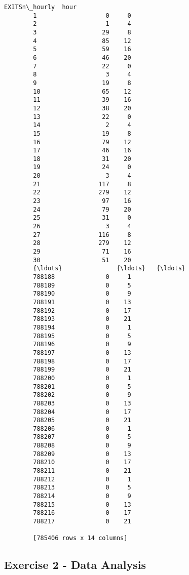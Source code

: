 \documentclass[11pt]{article}
\begin{document}
\begin{Verbatim}[commandchars=\\\{\}]
                EXITSn\_hourly  hour  
        1                   0     0  
        2                   1     4  
        3                  29     8  
        4                  85    12  
        5                  59    16  
        6                  46    20  
        7                  22     0  
        8                   3     4  
        9                  19     8  
        10                 65    12  
        11                 39    16  
        12                 38    20  
        13                 22     0  
        14                  2     4  
        15                 19     8  
        16                 79    12  
        17                 46    16  
        18                 31    20  
        19                 24     0  
        20                  3     4  
        21                117     8  
        22                279    12  
        23                 97    16  
        24                 79    20  
        25                 31     0  
        26                  3     4  
        27                116     8  
        28                279    12  
        29                 71    16  
        30                 51    20  
        {\ldots}               {\ldots}   {\ldots}  
        788188              0     1  
        788189              0     5  
        788190              0     9  
        788191              0    13  
        788192              0    17  
        788193              0    21  
        788194              0     1  
        788195              0     5  
        788196              0     9  
        788197              0    13  
        788198              0    17  
        788199              0    21  
        788200              0     1  
        788201              0     5  
        788202              0     9  
        788203              0    13  
        788204              0    17  
        788205              0    21  
        788206              0     1  
        788207              0     5  
        788208              0     9  
        788209              0    13  
        788210              0    17  
        788211              0    21  
        788212              0     1  
        788213              0     5  
        788214              0     9  
        788215              0    13  
        788216              0    17  
        788217              0    21  
        
        [785406 rows x 14 columns]
\end{Verbatim}
            
    \subsection{Exercise 2 - Data
Analysis}\label{exercise-2---data-analysis}
\end{document}

